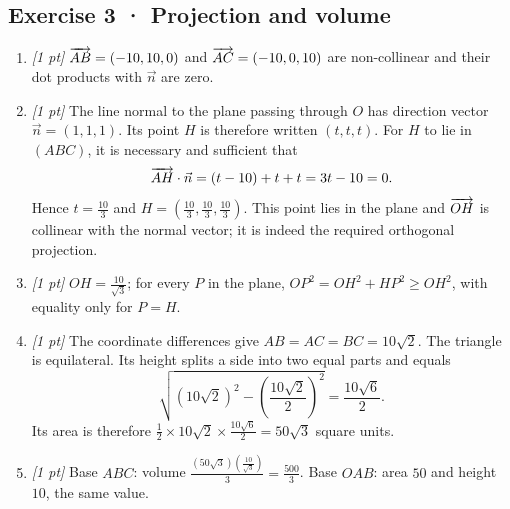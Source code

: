 \subsection*{Exercise 3 · Projection and volume}\begin{enumerate}

\item \textit{[1 pt]} $\overrightarrow{AB}=(-10,10,0)$ and $\overrightarrow{AC}=(-10,0,10)$ are non-collinear and their dot products with $\vec n$ are zero.

\item \textit{[1 pt]} The line normal to the plane passing through $O$ has direction vector $\vec n=(1,1,1)$. Its point $H$ is therefore written $(t,t,t)$. For $H$ to lie in $(ABC)$, it is necessary and sufficient that
\[\overrightarrow{AH}\cdot\vec n=(t-10)+t+t=3t-10=0.\]
Hence $t=\frac{10}{3}$ and $H=(\frac{10}{3},\frac{10}{3},\frac{10}{3})$. This point lies in the plane and $\overrightarrow{OH}$ is collinear with the normal vector; it is indeed the required orthogonal projection.

\item \textit{[1 pt]} $OH=\frac{10}{\sqrt{3}}$; for every $P$ in the plane, $OP^2=OH^2+HP^2\ge OH^2$, with equality only for $P=H$.

\item \textit{[1 pt]} The coordinate differences give $AB=AC=BC=10\sqrt2$. The triangle is equilateral. Its height splits a side into two equal parts and equals
\[\sqrt{(10\sqrt2)^2-(\frac{10\sqrt{2}}{2})^2}=\frac{10\sqrt6}{2}.\]
Its area is therefore $\frac12\times 10\sqrt2\times\frac{10\sqrt6}{2}=50\sqrt3$ square units.

\item \textit{[1 pt]} Base $ABC$: volume $\frac{(50\sqrt3)(\frac{10}{\sqrt{3}})}{3}=\frac{500}{3}$. Base $OAB$: area $50$ and height $10$, the same value.

\end{enumerate}

